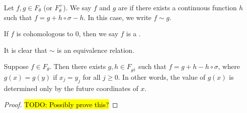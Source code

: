 \begin{definition}
	Let $f, g \in F_\theta$ (or $F_\theta^+$). We say $f$ and $g$ are  if there exists a continuous function $h$ such that $f = g + h \circ \sigma - h$. In this case, we write $f \sim g$.
	
	If $f$ is cohomologous to $0$, then we say $f$ is a .
\end{definition}

\begin{remark}
	It is clear that $\sim$ is an equivalence relation.
\end{remark}

\begin{proposition}
	Suppose $f \in F_\theta$. Then there exists $g, h \in F_{\theta^{\frac{1}{2}}}$ such that $f = g + h - h \circ \sigma$, where $g(x) = g(y)$ if $x_j = y_j$ for all $j \geq 0$. In other words, the value of $g(x)$ is determined only by the future coordinates of $x$.
	\begin{proof}
		\hl{TODO: Possibly prove this?}
	\end{proof}
\end{proposition}

\begin{comment}
If a function $f : \Sigma \to \complex$ is $\alpha$-H\"older continuous, $\alpha \in (0, 1]$, then it is a Lipschitz function with respect to $d_{\theta^\alpha}$.

Suppose we have $0 < \theta < \theta' < 1$. Then
\[
	F_{\theta'}(\Sigma) \supset F_\theta(\Sigma) \quad \text{and} \quad F_{\theta'}^+(\Sigma^+) \supset F_\theta^+(\Sigma^+).
\]
We can therefore define
\[
	F = \bigcup_{0 < \theta < 1}{F_\theta(\Sigma)} \quad \text{and} \quad F^+ = \bigcup_{0 < \theta < 1}{F_\theta^+(\Sigma^+)},
\]
the spaces of all H\"older continuous functions.


We now consider a class of functions lying in $F_\theta^+$ for all $0 < \theta < 1$. For all $m \geq 1$ we define
\[
	F_m^+ = \{f : \Sigma^+ \to \complex \mid f(x) = f(y) \text{ if } x_j = y_j, \text{ for all } 0 \leq j < m\},
\]
the set of all locally constant functions which depend on the first $m$ terms of $x \in \Sigma^+$. It is clear that
\[
	F_1^+ \subset F_2^+ \subset F_3^+ \subset \dots.
\]
and, for $f \in F_m^+$, $\var_m(f) = 0$. Hence
\[
	\bigcup_{m = 1}^\infty{F_m^+} \subset \bigcap_{0 < \theta < 1}{F_\theta^+}.
\]

\begin{proposition}
	Suppose $0 < \theta < \theta' < 1$. Then for all $m \geq 0$ we have
	\begin{equation*}
		|f - f_m|_{\theta'} \leq |f|_\theta \left(\frac{\theta}{\theta'}\right)^m.
	\end{equation*}
\end{proposition}
\end{comment}

